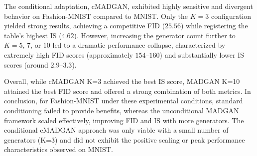 The conditional adaptation, cMADGAN, exhibited highly sensitive and divergent behavior on Fashion-MNIST compared to MNIST. Only the $K = 3$ configuration yielded strong results, achieving a competitive FID ($25.56$) while registering the table's highest IS ($4.62$). However, increasing the generator count further to $K = 5$, $7$, or $10$ led to a dramatic performance collapse, characterized by extremely high FID scores (approximately $154$–$160$) and substantially lower IS scores (around $2.9$–$3.3$).

Overall, while cMADGAN K=3 achieved the best IS score, MADGAN K=10 attained the best FID score and offered a strong combination of both metrics. In conclusion, for Fashion-MNIST under these experimental conditions, standard conditioning failed to provide benefits, whereas the unconditional MADGAN framework scaled effectively, improving FID and IS with more generators. The conditional cMADGAN approach was only viable with a small number of generators (K=3) and did not exhibit the positive scaling or peak performance characteristics observed on MNIST.

